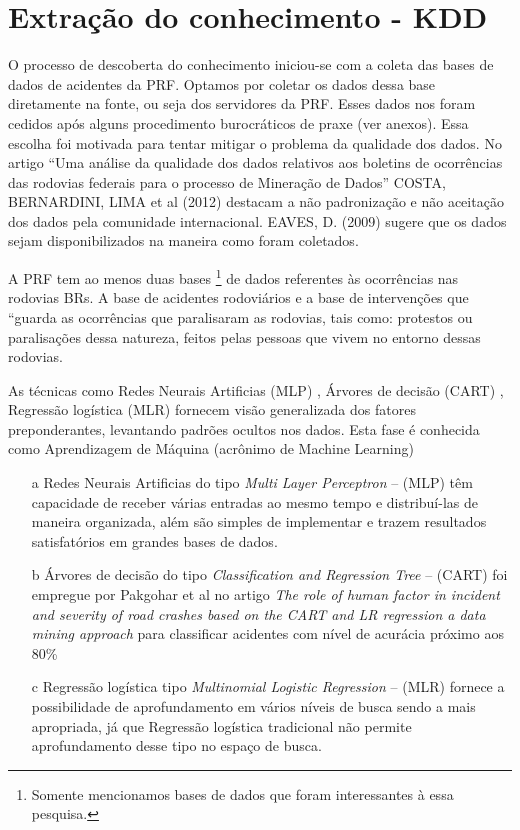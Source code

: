 \pagebreak

\section{Extração do conhecimento - KDD}

O processo de descoberta do conhecimento iniciou-se com a coleta das bases de dados de acidentes da PRF. Optamos por coletar os dados dessa base diretamente na fonte,
ou seja dos servidores da PRF. Esses dados nos foram cedidos após alguns procedimento burocráticos de praxe (ver anexos). Essa escolha foi motivada para tentar
mitigar o problema da qualidade dos dados. No artigo ``Uma análise da qualidade dos dados relativos aos boletins de ocorrências das rodovias 
federais para o processo de Mineração de Dados'' COSTA, BERNARDINI, LIMA et al (2012) destacam a não padronização e não aceitação dos dados pela 
comunidade internacional. EAVES, D. (2009) sugere que os dados sejam disponibilizados na maneira como foram coletados.

A PRF tem ao menos duas bases \footnote{Somente mencionamos bases de dados que foram interessantes à essa pesquisa.} de dados referentes às ocorrências 
nas rodovias BRs. A base de acidentes rodoviários e a base de intervenções que ``guarda as ocorrências que paralisaram as rodovias, tais como:
protestos ou paralisações dessa natureza, feitos pelas pessoas que vivem no entorno dessas rodovias.

As técnicas como Redes Neurais Artificias (MLP) \cite{DecisaoCredito}, Árvores de decisão (CART) \cite{DataMining}, Regressão logística (MLR) 
\cite{RegrecaoLog} fornecem visão generalizada dos fatores preponderantes, levantando padrões ocultos nos dados. Esta fase é conhecida como 
Aprendizagem de Máquina (acrônimo de Machine Learning)

\begin{itemize}
 \item[a] Redes Neurais Artificias do tipo \textit{ Multi Layer Perceptron}  -- (MLP) têm capacidade de receber várias entradas ao mesmo tempo e distribuí-las de maneira organizada, além 
	  são simples de implementar e trazem resultados satisfatórios em grandes bases de dados.
 
 \item[b] Árvores de decisão do tipo \textit{ Classification and Regression Tree}  -- (CART) foi empregue por Pakgohar et al no artigo 
	  \textit{The role of human factor in incident and severity of road crashes based on the CART and LR regression a data mining approach}  para classificar acidentes 
	  com nível de acurácia próximo aos 80\%

 \item[c] Regressão logística tipo \textit{Multinomial Logistic Regression} -- (MLR) fornece a possibilidade de aprofundamento em vários níveis de busca sendo a mais apropriada, já que Regressão logística 
	  tradicional não permite aprofundamento desse tipo no espaço de busca.
\end{itemize}




